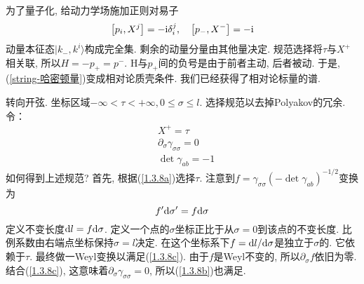 为了量子化, 给动力学场施加正则对易子
\begin{equation}
\left[p_{i}, X^{j}\right]=-\mathrm{i} \delta_{i}^{j}, \quad\left[p_{-}, X^{-}\right]=-\mathrm{i}
\end{equation}
动量本征态$|k_-,k^i\rangle$构成完全集. 剩余的动量分量由其他量决定. 规范选择将$\tau$与$X^+$相关联, 所以$H=-p_+ =p^-$. H与$p_+$间的负号是由于前者主动, 后者被动. 于是, (\ref{string-哈密顿量})变成相对论质壳条件. 我们已经获得了相对论标量的谱. 

转向开弦. 坐标区域$-\infty<\tau<+\infty, 0\leq \sigma\leq l$. 选择规范以去掉Polyakov的冗余. 令：
\begin{subequations}
\begin{align}
&X^+=\tau \label{1.3.8a} \\
&\partial_{\sigma} \gamma_{\sigma \sigma}=0 \label{1.3.8b} \\
&\operatorname{det} \gamma_{a b}=-1 \label{1.3.8c}
\end{align} \label{1.3.8}
\end{subequations}
如何得到上述规范? 首先, 根据(\ref{1.3.8a})选择$\tau$. 注意到$f=\gamma_{\sigma \sigma}\left(-\operatorname{det} \gamma_{a b}\right)^{-1 / 2}$变换为
\begin{equation}
f^{\prime} \mathrm{d} \sigma^{\prime}=f \mathrm{d} \sigma
\end{equation}
定义不变长度$\mathrm{d} l=f\mathrm{d} \sigma$. 定义一个点的$\sigma$坐标正比于从$\sigma=0$到该点的不变长度. 比例系数由右端点坐标保持$\sigma=l$决定. 在这个坐标系下$f=\mathrm{d} l/\mathrm{d} \sigma$是独立于$\sigma$的. 它依赖于$\tau$. 
最终做一Weyl变换以满足(\ref{1.3.8c}). 由于$f$是Weyl不变的, 所以$\partial_\sigma f$依旧为零. 结合(\ref{1.3.8c}), 这意味着$\partial_{\sigma} \gamma_{\sigma \sigma}=0$, 所以(\ref{1.3.8b})也满足. 

